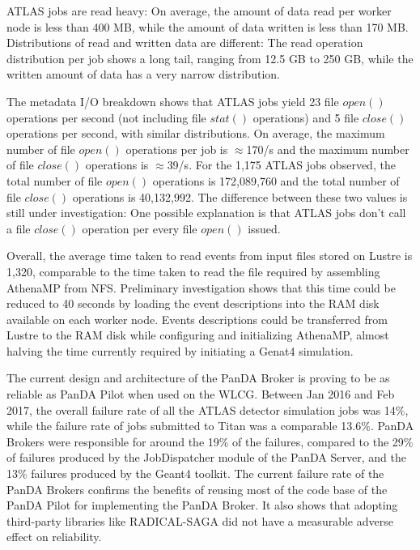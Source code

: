 ATLAS jobs are read heavy: On average, the amount of data read per worker node
is less than 400 MB, while the amount of data written is less than 170 MB.
Distributions of read and written data are different: The read operation
distribution per job shows a long tail, ranging from 12.5 GB to 250 GB, while
the written amount of data has a very narrow distribution.

The metadata I/O breakdown shows that ATLAS jobs yield 23 file $open()$
operations per second (not including file $stat()$ operations) and 5 file
$close()$ operations per second, with similar distributions. On average, the
maximum number of file $open()$ operations per job is $\approx$170/s and the
maximum number of file $close()$ operations is $\approx$39/s. For the 1,175
ATLAS jobs observed, the total number of file $open()$ operations is 172,089,760
and the total number of file $close()$ operations is 40,132,992. The difference
between these two values is still under investigation: One possible explanation
is that ATLAS jobs don't call a file $close()$ operation per every file $open()$
issued.

Overall, the average time taken to read events from input files stored on Lustre
is 1,320, comparable to the time taken to read the file required by assembling
AthenaMP from NFS. Preliminary investigation shows that this time could be
reduced to 40 seconds by loading the event descriptions into the RAM disk
available on each worker node. Events descriptions could be transferred from
Lustre to the RAM disk while configuring and initializing AthenaMP, almost
halving the time currently required by initiating a Genat4 simulation.

The current design and architecture of the PanDA Broker is proving to be as
reliable as PanDA Pilot when used on the WLCG. Between Jan 2016 and Feb 2017,
the overall failure rate of all the ATLAS detector simulation jobs was 14\%,
while the failure rate of jobs submitted to Titan was a comparable 13.6\%. PanDA
Brokers were responsible for around the 19\% of the failures, compared to the
29\% of failures produced by the JobDispatcher module of the PanDA Server, and
the 13\% failures produced by the Geant4 toolkit. The current failure rate of
the PanDA Brokers confirms the benefits of reusing most of the code base of the
PanDA Pilot for implementing the PanDA Broker. It also shows that adopting
third-party libraries like RADICAL-SAGA did not have a measurable adverse effect
on reliability.
